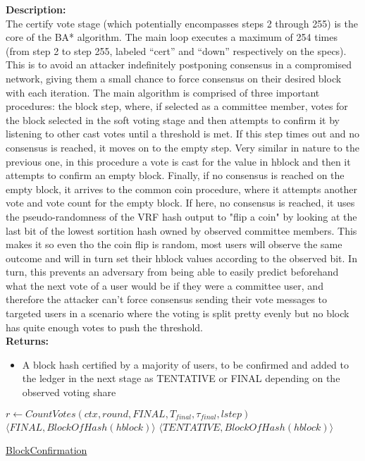 \documentclass[10pt,a4paper]{article}
\begin{document}
\noindent \textbf{Description:}\\
The certify vote stage (which potentially encompasses steps 2 through 255) is the core of the BA* algorithm.
The main loop executes a maximum of 254 times (from step 2 to step 255, labeled ``cert'' and ``down'' 
respectively on the specs).
This is to avoid an attacker indefinitely postponing consensus in a compromised network, giving them a 
small chance to force consensus on their desired block with each iteration.
The main algorithm is comprised of three important procedures: the block step, where, if selected as a 
committee member, votes for the block selected in the soft voting stage and then attempts to confirm it 
by listening to other cast votes until a threshold is met.
If this step times out and no consensus is reached, it moves on to the empty step. Very similar in nature 
to the previous one, in this procedure a vote is cast for the value in hblock and then it attempts to 
confirm an empty block.
Finally, if no consensus is reached on the empty block, it arrives to the common coin procedure, where 
it attempts another vote and vote count for the empty block. If here, no consensus is reached, it uses 
the pseudo-randomness of the VRF hash output to "flip a coin" by looking at the last bit of the lowest 
sortition hash owned by observed committee members.
This makes it so even tho the coin flip is random, most users will observe the same outcome and will 
in turn set their hblock values according to the observed bit. In turn, this prevents an adversary 
from being able to easily predict beforehand what the next vote of a user would be if they were a 
committee user, and therefore the attacker can't force consensus 
sending their vote messages to targeted users in a scenario where the voting is split pretty evenly 
but no block has quite enough votes to push the threshold.\\

\noindent \textbf{Returns:}
\begin{itemize}
    \item A block hash certified by a majority of users, to be confirmed and added to the ledger in the next stage as TENTATIVE or FINAL depending
    on the observed voting share
  \end{itemize}

\begin{algorithm}[H]
    \begin{algorithmic}[H]

    \State $r \gets CountVotes(ctx, round, FINAL, T_{final}, \tau_{final}, lstep)$
        \State \Return $\langle FINAL, BlockOfHash(hblock)\rangle$ 
    \Else
    {
        \State \Return $\langle TENTATIVE, BlockOfHash(hblock)\rangle $
    }
    \EndIf
    \EndFunction
    \end{algorithmic}
    \caption{\underline{BlockConfirmation}}
\end{algorithm}
\end{document}
